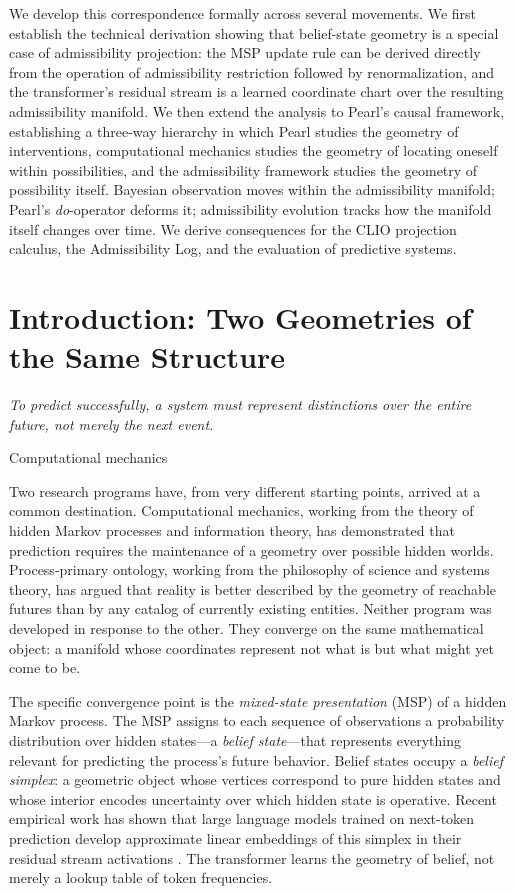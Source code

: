 \documentclass[12pt, a4paper]{article}
\theoremstyle{plain}
\theoremstyle{definition}
\theoremstyle{remark}
\begin{document}
We develop this correspondence formally across several movements. We first
establish the technical derivation showing that belief-state geometry is a
special case of admissibility projection: the MSP update rule can be derived
directly from the operation of admissibility restriction followed by
renormalization, and the transformer's residual stream is a learned coordinate
chart over the resulting admissibility manifold. We then extend the analysis
to Pearl's causal framework, establishing a three-way hierarchy in which
Pearl studies the geometry of interventions, computational mechanics studies
the geometry of locating oneself within possibilities, and the admissibility
framework studies the geometry of possibility itself. Bayesian observation
moves within the admissibility manifold; Pearl's \emph{do}-operator deforms
it; admissibility evolution tracks how the manifold itself changes over time.
We derive consequences for the CLIO projection calculus, the Admissibility
Log, and the evaluation of predictive systems.
\newpage

\tableofcontents
\newpage

\section{Introduction: Two Geometries of the Same Structure}

\epigraph{\textit{To predict successfully, a system must represent
distinctions over the entire future, not merely the next event.}}{Computational mechanics}

\noindent
Two research programs have, from very different starting points, arrived at a
common destination. Computational mechanics, working from the theory of hidden
Markov processes and information theory, has demonstrated that prediction
requires the maintenance of a geometry over possible hidden worlds. Process-primary
ontology, working from the philosophy of science and systems theory, has argued
that reality is better described by the geometry of reachable futures than by
any catalog of currently existing entities. Neither program was developed in
response to the other. They converge on the same mathematical object:
a manifold whose coordinates represent not what is but what might yet come to be.

The specific convergence point is the \emph{mixed-state presentation} (MSP)
of a hidden Markov process. The MSP assigns to each sequence of observations
a probability distribution over hidden states---a \emph{belief state}---that
represents everything relevant for predicting the process's future behavior.
Belief states occupy a \emph{belief simplex}: a geometric object whose
vertices correspond to pure hidden states and whose interior encodes
uncertainty over which hidden state is operative. Recent empirical work has
shown that large language models trained on next-token prediction develop
approximate linear embeddings of this simplex in their residual stream
activations \citep{shai2025}. The transformer learns the geometry
of belief, not merely a lookup table of token frequencies.
\end{document}
